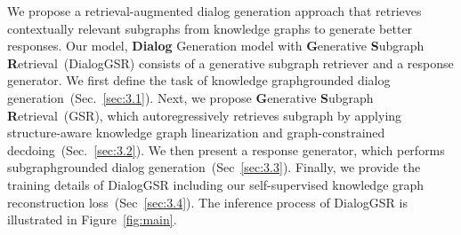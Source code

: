 We propose a retrieval-augmented dialog generation approach that retrieves contextually relevant subgraphs from knowledge graphs to generate better responses.
Our model, \textbf{Dialog} Generation model with \textbf{G}enerative \textbf{S}ubgraph \textbf{R}etrieval~(DialogGSR) consists of a generative subgraph retriever and a response generator.
We first define the task of knowledge graph{\textendash}grounded dialog generation~(Sec.~\ref{sec:3.1}).
Next, we propose \textbf{G}enerative \textbf{S}ubgraph \textbf{R}etrieval~(GSR), which autoregressively retrieves subgraph by applying structure-aware knowledge graph linearization and graph-constrained decdoing~(Sec.~\ref{sec:3.2}).
We then present a response generator, which performs subgraph{\textendash}grounded dialog generation~(Sec~\ref{sec:3.3}).
Finally, we provide the training details of DialogGSR including our self-supervised knowledge graph reconstruction loss~(Sec~\ref{sec:3.4}).
The inference process of DialogGSR is illustrated in Figure~\ref{fig:main}.